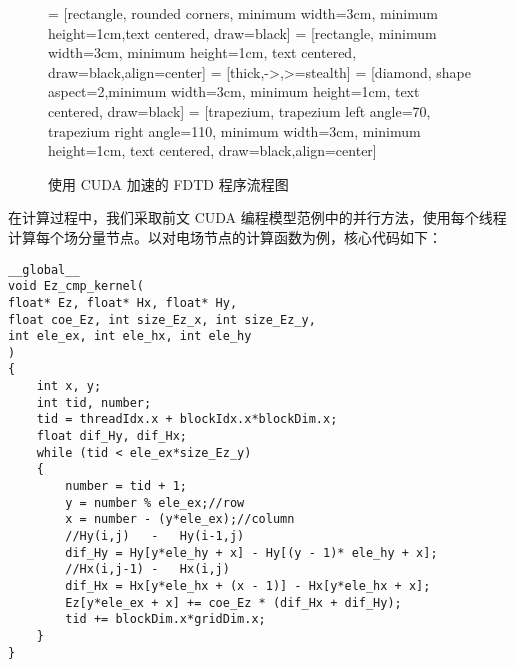 \begin{figure}[hp]
	\centering
	 = [rectangle, rounded corners, minimum width=3cm, minimum height=1cm,text centered, draw=black]
	 = [rectangle, minimum width=3cm, minimum height=1cm, text centered, draw=black,align=center]
	 = [thick,->,>=stealth]
	 = [diamond, shape aspect=2,minimum width=3cm, minimum height=1cm, text centered, draw=black]
	 = [trapezium, trapezium left angle=70, trapezium right angle=110, minimum width=3cm, minimum height=1cm, text centered, draw=black,align=center]
	\caption{使用 CUDA 加速的 FDTD 程序流程图}
	\label{ch4: workflow}
\end{figure}

在计算过程中，我们采取前文 CUDA 编程模型范例中的并行方法，使用每个线程计算每个场分量节点。以对电场节点的计算函数为例，核心代码如下：
\begin{lstlisting}
__global__
void Ez_cmp_kernel(
float* Ez, float* Hx, float* Hy,
float coe_Ez, int size_Ez_x, int size_Ez_y,
int ele_ex, int ele_hx, int ele_hy
)
{
	int x, y;
	int tid, number;
	tid = threadIdx.x + blockIdx.x*blockDim.x;
	float dif_Hy, dif_Hx;
	while (tid < ele_ex*size_Ez_y)
	{
		number = tid + 1;
		y = number % ele_ex;//row
		x = number - (y*ele_ex);//column
		//Hy(i,j)	-	Hy(i-1,j)
		dif_Hy = Hy[y*ele_hy + x] - Hy[(y - 1)* ele_hy + x];
		//Hx(i,j-1)	-	Hx(i,j)
		dif_Hx = Hx[y*ele_hx + (x - 1)] - Hx[y*ele_hx + x];
		Ez[y*ele_ex + x] += coe_Ez * (dif_Hx + dif_Hy);
		tid += blockDim.x*gridDim.x;
	}
}
\end{lstlisting}

